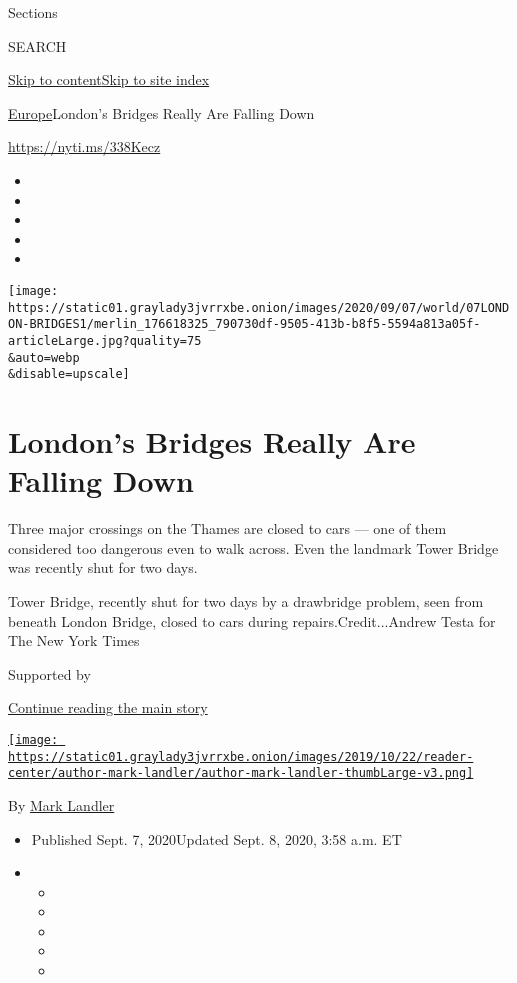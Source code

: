 Sections

SEARCH

\protect\hyperlink{site-content}{Skip to
content}\protect\hyperlink{site-index}{Skip to site index}

\href{/section/world/europe}{Europe}\textbar{}London's Bridges Really
Are Falling Down

\url{https://nyti.ms/338Kecz}

\begin{itemize}
\item
\item
\item
\item
\item
\end{itemize}

\texttt{[image: https://static01.graylady3jvrrxbe.onion/images/2020/09/07/world/07LONDON-BRIDGES1/merlin\_176618325\_790730df-9505-413b-b8f5-5594a813a05f-articleLarge.jpg?quality=75\\\&auto=webp\\\&disable=upscale]}

\hypertarget{londons-bridges-really-are-falling-down}{%
\section{London's Bridges Really Are Falling
Down}\label{londons-bridges-really-are-falling-down}}

Three major crossings on the Thames are closed to cars --- one of them
considered too dangerous even to walk across. Even the landmark Tower
Bridge was recently shut for two days.

Tower Bridge, recently shut for two days by a drawbridge problem, seen
from beneath London Bridge, closed to cars during
repairs.Credit...Andrew Testa for The New York Times

Supported by

\protect\hyperlink{after-sponsor}{Continue reading the main story}

\href{https://www.nytimes3xbfgragh.onion/by/mark-landler}{\texttt{[image: https://static01.graylady3jvrrxbe.onion/images/2019/10/22/reader-center/author-mark-landler/author-mark-landler-thumbLarge-v3.png]}}

By \href{https://www.nytimes3xbfgragh.onion/by/mark-landler}{Mark
Landler}

\begin{itemize}
\item
  Published Sept. 7, 2020Updated Sept. 8, 2020, 3:58 a.m. ET
\item
  \begin{itemize}
  \item
  \item
  \item
  \item
  \item
  \end{itemize}
\end{itemize}

